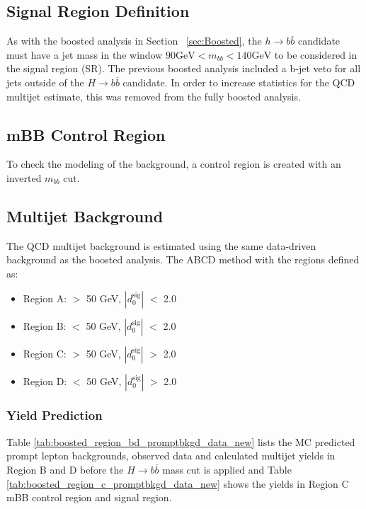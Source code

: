 \subsection{Signal Region Definition}
As with the boosted analysis in Section ~\ref{sec:Boosted}, the ${h\rightarrow b\overline{b}}$ candidate must have a jet mass in the window ${90 \mathrm{ GeV } < m_{bb} < 140 \mathrm{GeV}}$ to be considered in the signal region (SR). The previous boosted analysis included a b-jet veto for all jets outside of the ${H\rightarrow b\overline{b}}$ candidate. In order to increase statistics for the QCD multijet estimate, this was removed from the fully boosted analysis.

\subsection{mBB Control Region}
To check the modeling of the background, a control region is created with an inverted ${m_{bb}}$ cut. 
\subsection{Multijet Background}
The QCD multijet background is estimated using the same data-driven background as the boosted analysis. The ABCD method with the regions defined as:
\begin{itemize}
\item Region A: \met $>$ 50 GeV, $|d_{0}^{\textrm{sig}}|$ $<$ 2.0
\item Region B: \met $<$ 50 GeV, $|d_{0}^{\textrm{sig}}|$ $<$ 2.0
\item Region C: \met $>$ 50 GeV, $|d_{0}^{\textrm{sig}}|$ $>$ 2.0
\item Region D: \met $<$ 50 GeV, $|d_{0}^{\textrm{sig}}|$ $>$ 2.0
\end{itemize}

\subsubsection{Yield Prediction}
Table \ref{tab:boosted_region_bd_promptbkgd_data_new} lists the MC predicted prompt lepton backgrounds, observed data and calculated multijet yields in Region B and D before the ${H\rightarrow b\overline{b}}$ mass cut is applied and Table \ref{tab:boosted_region_c_promptbkgd_data_new} shows the yields in Region C mBB control region and signal region.\newline

